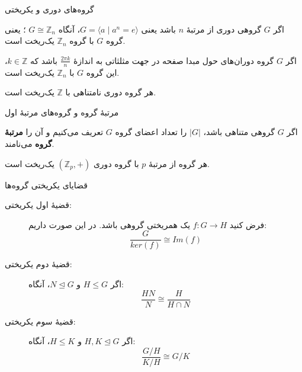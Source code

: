 \begin{frame}[t]{گروه‌های دوری و یکریختی}
    \begin{example}
        اگر $G$ گروهی دوری از مرتبهٔ $n$ باشد یعنی $G = \langle a \mid a^n = e \rangle$، آنگاه $G \cong \mathbb{Z}_n$ ؛ یعنی گروه $G$ با گروه $\mathbb{Z}_n$ یک‌ریخت است.
    \end{example}

    \begin{example}
        اگر $G$ گروه دوران‌های حول مبدا صفحه در جهت مثلثاتی به اندازهٔ $\frac{2\pi k}{n}$ باشد که $k \in \mathbb{Z}$، این گروه $G$ با $\mathbb{Z}_n$ یک‌ریخت است.
    \end{example}

    \begin{example}
        هر گروه دوری نامتناهی با $\mathbb{Z}$ یک‌ریخت است.
    \end{example}

\end{frame}

\begin{frame}[t]{مرتبهٔ گروه و گروه‌های مرتبهٔ اول}
    \begin{definition}
        اگر
        $G$
        گروهی متناهی باشد،
        $|G|$
        را تعداد اعضای گروه
        $G$
        تعریف می‌کنیم و آن را
        \textbf{مرتبهٔ گروه} می‌نامند.
    \end{definition}



    \begin{example}
        هر گروه از مرتبهٔ
        $p$
        با گروه دوری $(\mathbb{Z}_p,+)$ یک‌ریخت است.
    \end{example}



\end{frame}

\begin{frame}[t]{قضایای یکریختی گروه‌ها}
    \begin{theorem}
        \begin{description}
            \item[قضیهٔ اول یکریختی:]
                  فرض کنید $f \colon G \to H$ یک همریختی گروهی باشد. در این صورت داریم:
                  \[
                      \frac{G}{ker(f)} \cong Im(f)
                  \]

            \item[قضیهٔ دوم یکریختی:]
                  اگر $H \leq G$ و $N \trianglelefteq G$، آنگاه:
                  \[
                      \frac{HN}{N} \cong \frac{H}{H \cap N}
                  \]

            \item[قضیهٔ سوم یکریختی:]
                  اگر
                  $H, K \trianglelefteq G$
                  و
                  $H \leq K $، آنگاه:
                  \[
                      \frac{G/H}{K/H} \cong G/K
                  \]
        \end{description}
    \end{theorem}



\end{frame}

